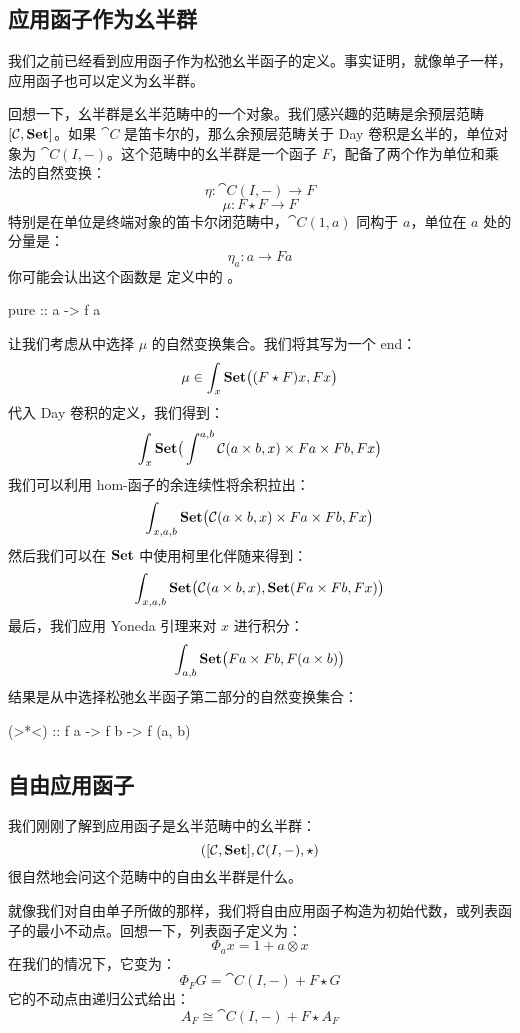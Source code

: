 \documentclass[DaoFP]{subfiles}
\begin{document}
\subsection{应用函子作为幺半群}

我们之前已经看到应用函子作为松弛幺半函子的定义。事实证明，就像单子一样，应用函子也可以定义为幺半群。

回想一下，幺半群是幺半范畴中的一个对象。我们感兴趣的范畴是余预层范畴 $[\mathcal{C}, \mathbf{Set}]$。如果 $\cat C$ 是笛卡尔的，那么余预层范畴关于 Day 卷积是幺半的，单位对象为 $\cat C(I, -)$。这个范畴中的幺半群是一个函子 $F$，配备了两个作为单位和乘法的自然变换：
\[ \eta \colon \cat C(I, -) \to F \]
\[ \mu \colon F \star F \to F \]
特别是在单位是终端对象的笛卡尔闭范畴中，$\cat C(1, a)$ 同构于 $a$，单位在 $a$ 处的分量是：
\[ \eta_a \colon a \to F a \] 
你可能会认出这个函数是  定义中的 。
\begin{haskell}
pure :: a -> f a
\end{haskell}

让我们考虑从中选择 $\mu$ 的自然变换集合。我们将其写为一个 end：
\[ \mu \in \int_x \mathbf{Set} \big( (F \star F) x, F x \big) \]
代入 Day 卷积的定义，我们得到：
\[ \int_x \mathbf{Set} \big( \int^{a, b} \mathcal{C} (a \times b, x) \times F a \times  F b, F x \big) \]
我们可以利用 hom-函子的余连续性将余积拉出：
\[ \int_{x, a, b} \mathbf{Set} \big( \mathcal{C} (a \times b, x) \times F a \times  F b, F x \big) \]
然后我们可以在 $\mathbf{Set}$ 中使用柯里化伴随来得到：
\[ \int_{x, a, b} \mathbf{Set} \big( \mathcal{C} (a \times b, x),  \mathbf{Set}( F a \times  F b, F x) \big) \]
最后，我们应用 Yoneda 引理来对 $x$ 进行积分：
\[ \int_{a, b}  \mathbf{Set} \big( F a \times  F b, F (a \times b) \big) \]
结果是从中选择松弛幺半函子第二部分的自然变换集合：
\begin{haskell}
  (>*<) :: f a -> f b -> f (a, b)
\end{haskell}

\subsection{自由应用函子}

我们刚刚了解到应用函子是幺半范畴中的幺半群：
\[ ([\mathcal{C}, \mathbf{Set}], \mathcal{C}(I, -), \star) \]
很自然地会问这个范畴中的自由幺半群是什么。

就像我们对自由单子所做的那样，我们将自由应用函子构造为初始代数，或列表函子的最小不动点。回想一下，列表函子定义为：
\[ \Phi_a x = 1 + a \otimes x \]
在我们的情况下，它变为：
\[ \Phi_F G = \cat C(I, -) + F \star G \]
它的不动点由递归公式给出：
\[ A_F \cong \cat C(I, -) + F \star A_F\]
\end{document}
